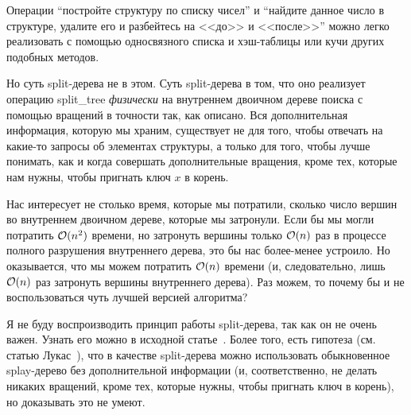 
\begin{remark} Операции ``постройте структуру по списку чисел'' и ``найдите данное число в структуре, удалите его и разбейтесь на <<до>> и <<после>>'' можно легко реализовать с помощью односвязного списка и хэш-таблицы или кучи других подобных методов.

	Но суть split-дерева не в этом. Суть split-дерева в том, что оно реализует операцию \textrm{split\_tree} \emph{физически} на внутреннем двоичном дереве поиска с помощью вращений в точности так, как описано. Вся дополнительная информация, которую мы храним, существует не для того, чтобы отвечать на какие-то запросы об элементах структуры, а только для того, чтобы лучше понимать, как и когда совершать дополнительные вращения, кроме тех, которые нам нужны, чтобы пригнать ключ $x$ в корень.

	Нас интересует не столько время, которые мы потратили, сколько число вершин во внутреннем двоичном дереве, которые мы затронули. Если бы мы могли потратить $\mathcal{O}(n^2)$ времени, но затронуть вершины только $\mathcal{O}(n)$ раз в процессе полного разрушения внутреннего дерева, это бы нас более-менее устроило. Но оказывается, что мы можем потратить $\mathcal{O}(n)$ времени (и, следовательно, лишь $\mathcal{O}(n)$ раз затронуть вершины внутреннего дерева). Раз можем, то почему бы и не воспользоваться чуть лучшей версией алгоритма?

	Я не буду воспроизводить принцип работы split-дерева, так как он не очень важен. Узнать его можно в исходной статье~\cite{demaine2009geometry}. Более того, есть гипотеза (см. статью Лукас~\cite{lucas1988canonical}), что в качестве split-дерева можно использовать обыкновенное splay-дерево без дополнительной информации (и, соответственно, не делать никаких вращений, кроме тех, которые нужны, чтобы пригнать ключ в корень), но доказывать это не умеют.
\end{remark}

